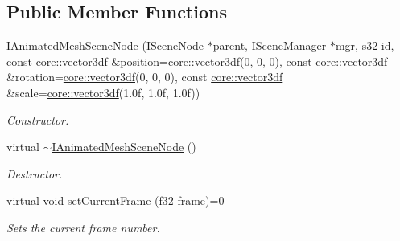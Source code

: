 \subsection*{Public Member Functions}
\begin{DoxyCompactItemize}
\item 
\mbox{\label{classirr_1_1scene_1_1IAnimatedMeshSceneNode_a6c76b97d6e587e81e057a038dde0956b}} 
\hyperlink{classirr_1_1scene_1_1IAnimatedMeshSceneNode_a6c76b97d6e587e81e057a038dde0956b}{I\+Animated\+Mesh\+Scene\+Node} (\hyperlink{classirr_1_1scene_1_1ISceneNode}{I\+Scene\+Node} $\ast$parent, \hyperlink{classirr_1_1scene_1_1ISceneManager}{I\+Scene\+Manager} $\ast$mgr, \hyperlink{namespaceirr_ac66849b7a6ed16e30ebede579f9b47c6}{s32} id, const \hyperlink{namespaceirr_1_1core_a06f169d08b5c429f5575acb7edbad811}{core\+::vector3df} \&position=\hyperlink{namespaceirr_1_1core_a06f169d08b5c429f5575acb7edbad811}{core\+::vector3df}(0, 0, 0), const \hyperlink{namespaceirr_1_1core_a06f169d08b5c429f5575acb7edbad811}{core\+::vector3df} \&rotation=\hyperlink{namespaceirr_1_1core_a06f169d08b5c429f5575acb7edbad811}{core\+::vector3df}(0, 0, 0), const \hyperlink{namespaceirr_1_1core_a06f169d08b5c429f5575acb7edbad811}{core\+::vector3df} \&scale=\hyperlink{namespaceirr_1_1core_a06f169d08b5c429f5575acb7edbad811}{core\+::vector3df}(1.\+0f, 1.\+0f, 1.\+0f))
\begin{DoxyCompactList}\small\item\em Constructor. \end{DoxyCompactList}\item 
\mbox{\label{classirr_1_1scene_1_1IAnimatedMeshSceneNode_ae914c207eb12ae9025bfd102922c01cf}} 
virtual \hyperlink{classirr_1_1scene_1_1IAnimatedMeshSceneNode_ae914c207eb12ae9025bfd102922c01cf}{$\sim$\+I\+Animated\+Mesh\+Scene\+Node} ()
\begin{DoxyCompactList}\small\item\em Destructor. \end{DoxyCompactList}\item 
virtual void \hyperlink{classirr_1_1scene_1_1IAnimatedMeshSceneNode_aff1c1e2270f4d3d94e58e7c130c575a4}{set\+Current\+Frame} (\hyperlink{namespaceirr_a0277be98d67dc26ff93b1a6a1d086b07}{f32} frame)=0
\begin{DoxyCompactList}\small\item\em Sets the current frame number. \end{DoxyCompactList}\item 

\end{DoxyCompactItemize}
